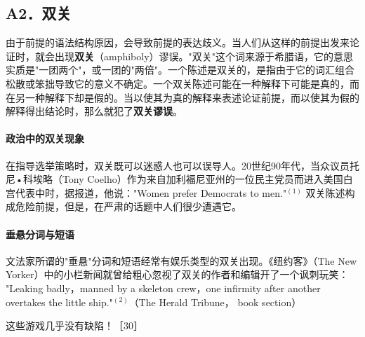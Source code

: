 \subsection{A2．双关}

由于前提的语法结构原因，会导致前提的表达歧义。当人们从这样的前提出发来论证时，就会出现\textbf{双关}（amphiboly）谬误。"双关"这个词来源于希腊语，它的意思实质是"一团两个"，或一团的"两倍"。一个陈述是双关的，是指由于它的词汇组合松散或笨拙导致它的意义不确定。一个双关陈述可能在一种解释下可能是真的，而在另一种解释下却是假的。当以使其为真的解释来表述论证前提，而以使其为假的解释得出结论时，那么就犯了\textbf{双关谬误}。

\paragraph{政治中的双关现象}
在指导选举策略时，双关既可以迷惑人也可以误导人。20世纪90年代，当众议员托尼•科埃略（Tony Coelho）作为来自加利福尼亚州的一位民主党员而进入美国白宫代表中时，据报道，他说："Women prefer Democrats to men."${ }^{(1)}$ 双关陈述构成危险前提，但是，在严肃的话题中人们很少遭遇它。

\paragraph{垂悬分词与短语}
文法家所谓的"垂悬"分词和短语经常有娱乐类型的双关出现。《纽约客》（The New Yorker）中的小栏新闻就曾给粗心忽视了双关的作者和编辑开了一个讽刺玩笑：\\
"Leaking badly，manned by a skeleton crew，one infirmity after another overtakes the little ship."${ }^{(2)}$（The Herald Tribune， book section）

这些游戏几乎没有缺陷！［30］

